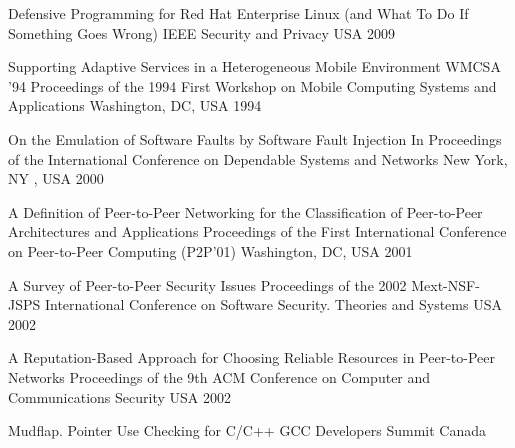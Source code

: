 \begin{thebibliography}{9}
		{}
		{Defensive Programming for {R}ed {H}at {E}nterprise {L}inux (and What To Do If Something Goes Wrong)}
		{{IEEE} Security and Privacy}
		{}
		{}
		{USA}
		{2009}
		{}
		

		{
			\biband
			\biband
			\biband
			}
		{Supporting Adaptive Services in a Heterogeneous Mobile Environment}
		{WMCSA '94 Proceedings of the 1994 First Workshop on Mobile Computing Systems and Applications}
		{Washington, DC, USA}
		{1994}
		
		{
			\biband
			\biband
			}
		{On the Emulation of Software Faults by Software Fault Injection}
		{In Proceedings of the International Conference on Dependable Systems and Networks}
		{New York, NY , USA}
		{2000}
	
		{}
		{A Definition of Peer-to-Peer Networking for the Classification of Peer-to-Peer Architectures and Applications}
		{Proceedings of the First International Conference on Peer-to-Peer Computing ({P2P}'01)}
		{Washington, DC, USA}
		{2001}

		{}
		{A Survey of Peer-to-Peer Security Issues}
		{Proceedings of the 2002 {M}ext-{NSF}-{JSPS} International Conference on Software Security. Theories and Systems}
		{USA}
		{2002}
	
		{
			\biband
			\biband
			\biband
			\biband
			}
		{A Reputation-Based Approach for Choosing Reliable Resources in Peer-to-Peer Networks}
		{Proceedings of the 9th ACM Conference on Computer and Communications Security}
		{USA}
		{2002}
		
		{}
		{Mudflap. Pointer Use Checking for {C/C++}}
		{{GCC} Developers Summit}
		{Canada}
		{}
	

\end{thebibliography}
